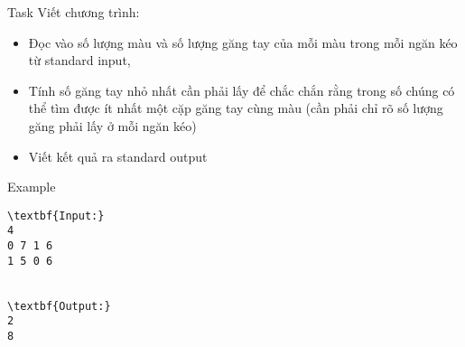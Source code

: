 Task  
Viết chương trình:  
\begin{itemize}
	\item     Đọc vào số lượng màu và số lượng găng tay của mỗi màu trong mỗi ngăn kéo từ standard input,   
	\item     Tính số găng tay nhỏ nhất cần phải lấy để chắc chắn rằng trong số chúng có thể tìm được ít nhất một cặp găng tay cùng màu (cần phải chỉ rõ số lượng găng phải lấy ở mỗi ngăn kéo)   
	\item     Viết kết quả ra standard output   
\end{itemize}
   Example  
\begin{verbatim}
\textbf{Input:}
4
0 7 1 6
1 5 0 6


\textbf{Output:}
2
8

\end{verbatim}